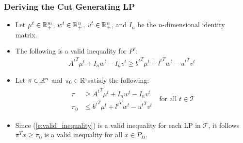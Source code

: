 \documentclass{beamer}
\begin{document}
	\begin{frame}[t]
		\frametitle{Deriving the Cut Generating LP}
		\small
		\begin{itemize}
			\item Let $ \mu^{t} \in \mathbb{R}_+^m $, $ w^{t} \in \mathbb{R}_+^n $, $ v^{t} \in \mathbb{R}_+^n $, and $ I_n $ be the $ n $-dimensional identity matrix. 
			\item The following is a valid inequality for $ P^{t} $:
			\begin{align}
				{A^{t}}^T \mu^{t} + I_n w^{t} - I_n v^{t} \geq {b^{t}}^T \mu^{t} + {l^{t}}^T w^{t} - {u^{t}}^T v^{t} \label{e:valid_inequality}
			\end{align}
			\item Let $ \pi \in \mathbb{R}^n $ and $ \pi_0 \in \mathbb{R} $ satisfy the following:
			\begin{align}
				\begin{split}
					\pi &\geq {A^{t}}^T \mu^{t} + I_n w^{t} - I_n v^{t} \\
					\pi_0 & \leq {b^{t}}^T \mu^{t} + {l^{t}}^T w^{t} - {u^{t}}^T v^{t}
				\end{split} \; \text{ for all } t \in \mathcal{T} \label{e:disjunctive_inequality}
			\end{align}
			\item Since (\ref{e:valid_inequality}) is a valid inequality for each LP in $ \mathcal{T} $, it follows $ \pi^T x \geq \pi_0 $ is a valid inequality for all $ x \in P_D $.
		\end{itemize}
		\normalsize
	\end{frame}
\end{document}
